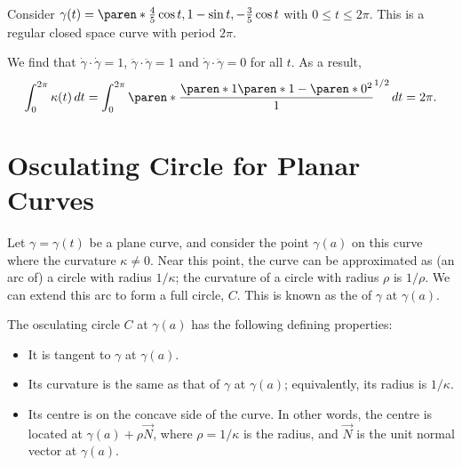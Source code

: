 \documentclass[11pt]{penrose}
\newcommand{\vN}{\vec{N}}
\begin{document}
\begin{negg}
    Consider $\gamma(t) = \paren*{ \frac{4}{5} \cos t, 1 - \sin t, -\frac{3}{5} \cos t }$ with $0 \leq t \leq 2\pi$. This is a regular closed space curve with period $2\pi$.

    We find that $\dot{\gamma}\cdot\dot{\gamma} = 1$, $\ddot{\gamma}\cdot\ddot{\gamma} = 1$ and $\dot{\gamma}\cdot\ddot{\gamma} = 0$ for all $t$. As a result,
    \begin{equation}
        \int_0^{2\pi} \kappa(t) \,dt
        = \int_{0}^{2\pi} \paren*{ \frac{ \paren*{1}\paren*{1} - \paren*{0}^2 }{ 1 } }^{1/2} \,dt
        = 2\pi.
    \end{equation}
\end{negg}


\section{Osculating Circle for Planar Curves}
Let $\gamma = \gamma(t)$ be a plane curve, and consider the point $\gamma(a)$ on this curve where the curvature $\kappa \neq 0$. Near this point, the curve can be approximated as (an arc of) a circle with radius $1/\kappa$; the curvature of a circle with radius $\rho$ is $1/\rho$. We can extend this arc to form a full circle, $C$. This is known as the  of $\gamma$ at $\gamma(a)$.

The osculating circle $C$ at $\gamma(a)$ has the following defining properties:
\begin{itemize}
    \item It is tangent to $\gamma$ at $\gamma(a)$.
    \item Its curvature is the same as that of $\gamma$ at $\gamma(a)$; equivalently, its radius is $1/\kappa$.
    \item Its centre is on the concave side of the curve. In other words, the centre is located at $\gamma(a) + \rho\vN$, where $\rho = 1/\kappa$ is the radius, and $\vN$ is the unit normal vector at $\gamma(a)$.
\end{itemize}
\end{document}
